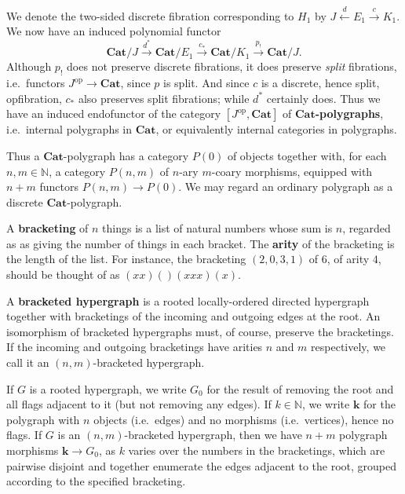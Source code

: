 \documentclass{article}
\theoremstyle{definition}
\theoremstyle{remark}
\def\Cat{\ensuremath{\mathbf{Cat}}}
\def\op{^{\mathrm{op}}}
\let\xto\xrightarrow
\let\xot\xleftarrow
\def\N{\mathbb{N}}
\begin{document}
We denote the two-sided discrete fibration corresponding to $H_1$ by $J \xot{d} E_1 \xto{c} K_1$.
We now have an induced polynomial functor
\[ \Cat/J \xto{d^*} \Cat/E_1 \xto{c_*} \Cat/K_1 \xto{p_!} \Cat/J. \]
Although $p_!$ does not preserve discrete fibrations, it does preserve \emph{split} fibrations, i.e.\ functors $J\op\to\Cat$, since $p$ is split.
And since $c$ is a discrete, hence split, opfibration, $c_*$ also preserves split fibrations; while $d^*$ certainly does.
Thus we have an induced endofunctor of the category $[J\op,\Cat]$ of \textbf{\Cat-polygraphs}, i.e.\ internal polygraphs in \Cat, or equivalently internal categories in polygraphs.


Thus a \Cat-polygraph has a category $P(0)$ of objects together with, for each $n,m\in\N$, a category $P(n,m)$ of $n$-ary $m$-coary morphisms, equipped with $n+m$ functors $P(n,m) \to P(0)$.
We may regard an ordinary polygraph as a discrete \Cat-polygraph.

A \textbf{bracketing} of $n$ things is a list of natural numbers whose sum is $n$, regarded as as giving the number of things in each bracket.
The \textbf{arity} of the bracketing is the length of the list.
For instance, the bracketing $(2,0,3,1)$ of $6$, of arity $4$, should be thought of as $(xx)()(xxx)(x)$.

A \textbf{bracketed hypergraph} is a rooted locally-ordered directed hypergraph together with bracketings of the incoming and outgoing edges at the root.
An isomorphism of bracketed hypergraphs must, of course, preserve the bracketings.
If the incoming and outgoing bracketings have arities $n$ and $m$ respectively, we call it an $(n,m)$-bracketed hypergraph.

If $G$ is a rooted hypergraph, we write $G_0$ for the result of removing the root and all flags adjacent to it (but not removing any edges).
If $k\in\N$, we write $\mathbf{k}$ for the polygraph with $n$ objects (i.e.\ edges) and no morphisms (i.e.\ vertices), hence no flags.
If $G$ is an $(n,m)$-bracketed hypergraph, then we have $n+m$ polygraph morphisms $\mathbf{k}\to G_0$, as $k$ varies over the numbers in the bracketings, which are pairwise disjoint and together enumerate the edges adjacent to the root, grouped according to the specified bracketing.
\end{document}
